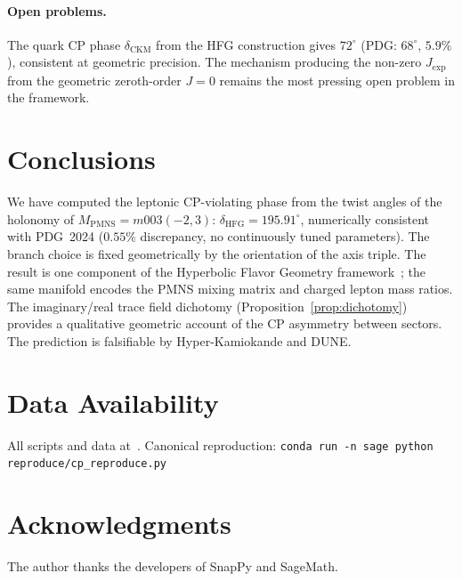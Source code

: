 \documentclass[11pt,a4paper]{article}
\theoremstyle{definition}
\theoremstyle{remark}
\newcommand{\MPMNS}{M_{\mathrm{PMNS}}}
\begin{document}
\paragraph{Open problems.}
The quark CP phase $\delta_{\mathrm{CKM}}$ from the HFG
construction gives $72^\circ$ (PDG: $68^\circ$, $5.9\%$),
consistent at geometric precision.
The mechanism producing the non-zero $J_\mathrm{exp}$ from the
geometric zeroth-order $J=0$ remains the most pressing open
problem in the framework.

\section{Conclusions}
\label{sec:conclusions}

We have computed the leptonic CP-violating phase from the
twist angles of the holonomy of $\MPMNS=m003(-2,3)$:
$\delta_{\mathrm{HFG}}=195.91^\circ$, numerically consistent
with PDG~2024 ($0.55\%$ discrepancy, no continuously tuned
parameters).
The branch choice is fixed geometrically by the orientation of
the axis triple.
The result is one component of the Hyperbolic Flavor Geometry
framework~\cite{Gentry:Unified}; the same manifold encodes the
PMNS mixing matrix and charged lepton mass ratios.
The imaginary/real trace field dichotomy
(Proposition~\ref{prop:dichotomy}) provides a qualitative
geometric account of the CP asymmetry between sectors.
The prediction is falsifiable by Hyper-Kamiokande and DUNE.

\section*{Data Availability}
All scripts and data at~\cite{GitHub}.
Canonical reproduction:
\texttt{conda run -n sage python reproduce/cp\_reproduce.py}

\section*{Acknowledgments}
The author thanks the developers of SnapPy and SageMath.
\end{document}
